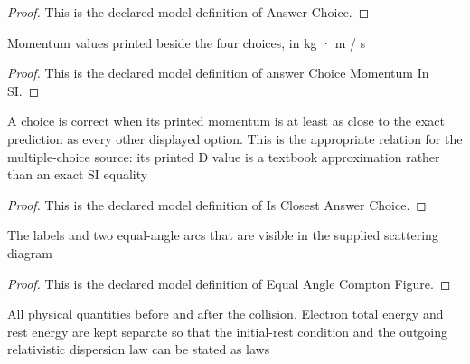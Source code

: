 \begin{proof}
  This is the declared model definition of Answer Choice.
\end{proof}
\begin{definition}
  \label{def:physics:phyx-mini-0531:phyxminiproblems-problemphyxmini0531-answerchoicemomentuminsi}
  Momentum values printed beside the four choices, in kg · m / s
\end{definition}
\begin{proof}
  This is the declared model definition of answer Choice Momentum In SI.
\end{proof}
\begin{definition}
  \label{def:physics:phyx-mini-0531:phyxminiproblems-problemphyxmini0531-isclosestanswerchoice}
  A choice is correct when its printed momentum is at least as close to the exact prediction as every other displayed option. This is the appropriate relation for the multiple-choice source: its printed D value is a textbook approximation rather than an exact SI equality
\end{definition}
\begin{proof}
  This is the declared model definition of Is Closest Answer Choice.
\end{proof}
\begin{definition}
  \label{def:physics:phyx-mini-0531:phyxminiproblems-problemphyxmini0531-equalanglecomptonfigure}
  The labels and two equal-angle arcs that are visible in the supplied scattering diagram
\end{definition}
\begin{proof}
  This is the declared model definition of Equal Angle Compton Figure.
\end{proof}
\begin{definition}
  \label{def:physics:phyx-mini-0531:phyxminiproblems-problemphyxmini0531-comptonscatteringsetup}
  All physical quantities before and after the collision. Electron total energy and rest energy are kept separate so that the initial-rest condition and the outgoing relativistic dispersion law can be stated as laws
\end{definition}
